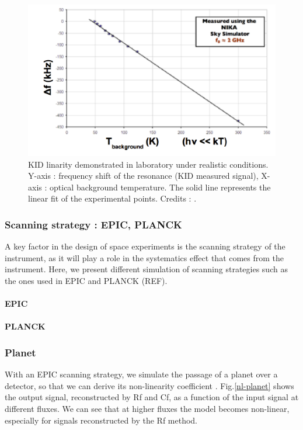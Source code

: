 \begin{figure}[h]
\center
	\includegraphics[scale=0.5]{Figures/KID-linearity-Monfardini2014.png}
	\caption{KID linarity demonstrated in laboratory under realistic conditions. Y-axis : frequency shift of the resonance (KID measured signal), X-axis : optical background temperature. The solid line represents the linear fit of the experimental points. Credits : \citet{2014JLTP..176..787M}.}
	\label{KID-lin}
\end{figure}

\subsubsection{Scanning strategy : EPIC, PLANCK}
A key factor in the design of space experiments is the scanning strategy of the instrument, as it will play a role in the systematics effect that comes from the instrument. Here, we present different simulation of scanning strategies such as the ones used in EPIC and PLANCK (REF).

\paragraph{EPIC}
\paragraph{PLANCK}

\subsubsection{Planet}
With an EPIC scanning strategy, we simulate the passage of a planet over a detector, so that we can derive its non-linearity coefficient \eps. Fig.\ref{nl-planet} shows the output signal, reconstructed by Rf and Cf, as a function of the input signal at different fluxes. We can see that at higher fluxes the model becomes non-linear, especially for signals reconstructed by the Rf method. 

